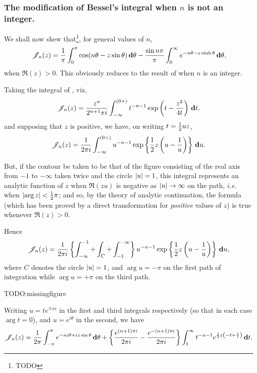 \documentclass{book}
\begin{document}
\subsubsection{The modification of Bessel's integral when $n$ is not
  an integer.}
We shall now shew that\footnote{TODO}, for general values of $n$,
\begin{equation}
  \mathscr{J}_n(z) 
  =
  \frac{1}{\pi}
  \int_0^{\pi} \cos(n\theta - z\sin\theta) \, \mathbf{d}\theta
  -
  \frac{\sin n\pi}{\pi}
  \int_0^{\infty} e^{-n\theta - z\sinh\theta} \, \mathbf{d}\theta,
\end{equation}
when $\Re(z) > 0$. This obviously reduces to the result of
 when $n$ is an integer.

Taking the integral of , viz,
$$
\mathscr{J}_n(z) 
=
\frac{z^n}{2^{n+1}\pi i}
\int_{-\infty}^{(0+)}
t^{-n-1}
\exp\left(  t - \frac{z^2}{4t}   \right)
\, \mathbf{d} t,
$$
% 
% 
and supposing that $z$ is positive, we have, on writing
$t = \frac{1}{2} u z$,
$$
\mathscr{J}_n(z) 
= 
\frac{1}{2\pi i} 
\int_{-\infty}^{(0+)}
u^{-n-1}
\exp \left\{  \frac{1}{2} z \left(  u - \frac{1}{u}   \right)   \right\}
\, \mathbf{d} u.
$$

But, if the contour be taken to be that of the figure consisting of
the real axis from $-1$ to $-\infty$ taken twice and the circle 
$\left| u \right| = 1$, this integral represents an analytic function of $z$
when $\Re(zu)$ is negative as
$\left| u \right| \rightarrow \infty$ on the path, \emph{i.e.} when 
$\left|  \arg z  \right| < \frac{1}{2} \pi$; and so, by the theory of analytic
continuation, the formula (which has been proved by a direct
transformation for \emph{positive} values of $z$) is true whenever 
$\Re(z) > 0$.

Hence
$$
\mathscr{J}_n(z)
=
\frac{1}{2\pi i}
\left\{ 
  \int_{-\infty}^{-1}
  +
  \int_C
  +
  \int_{-1}^{-\infty}
 \right\}
u^{-n-1}
\exp\left\{  \frac{1}{2} z \left(  u - \frac{1}{u}   \right)   \right\}
\, \mathbf{d} u,
$$
where $C$ denotes the circle $\left| u \right| = 1$, and 
$\arg u = -\pi$ on the first path of integration while 
$\arg u = +\pi$ on the third path.

TODO:missingfigure

Writing $u = t e^{\mp \pi i}$ in the first and third integrals
respectively (so that in each case $\arg t = 0$), and 
$u = e^{i\theta}$ in the second, we have
$$
\mathscr{J}_n(z) 
=
\frac{1}{2\pi}
\int_{-\pi}^{\pi}
e^{-ni\theta + iz\sin\theta}
\, \mathbf{d} \theta
+
\left\{ 
  \frac{e^{(n+1)\pi i}}{2\pi i}
  -
  \frac{e^{-(n+1)\pi i}}{2\pi i}
 \right\}
\int_1^{\infty}
t^{-n-1}
e^{\frac{1}{2} z \left( -t + \frac{1}{t} \right)}
\, \mathbf{d} t.
$$
\end{document}
